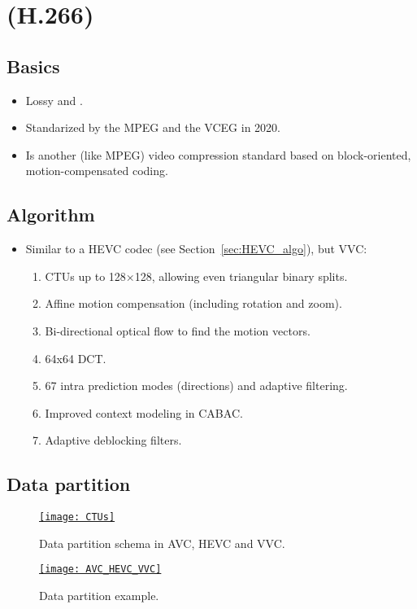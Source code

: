 \chapter{ (H.266)}

\section{Basics}
\begin{itemize}
\item Lossy and  \cite{wikipedia_VVC}.
\item Standarized by the \gls{MPEG} and the \gls{VCEG} in 2020.
\item Is another (like \gls{MPEG}) video compression standard based on
  block-oriented, motion-compensated coding.
\end{itemize}

\section{Algorithm}
\begin{itemize}
\item Similar to a \gls{HEVC} codec (see Section~\ref{sec:HEVC_algo}),
  but \gls{VVC}:
\begin{enumerate}
\item \glspl{CTU} up to 128×128, allowing even triangular binary splits.
\item Affine motion compensation (including rotation and zoom).
\item Bi-directional optical flow to find the motion vectors.
\item 64x64 \gls{DCT}.
\item 67 intra prediction modes (directions) and adaptive filtering.
\item Improved context modeling in \gls{CABAC}.
\item Adaptive deblocking filters.
\end{enumerate}
\end{itemize}

\section{Data partition}

\begin{figure}[H]
  \centering
  \href{https://thebroadcastknowledge.com/2020/11/25/video-the-new-video-codec-landscape-vvc-evc-hevc-lc-evc-av1-and-more/}{\texttt{[image: CTUs]}}
  \caption{Data partition schema in \gls{AVC}, \gls{HEVC} and \gls{VVC}.}
  \label{fig:VVC_partition_1}
\end{figure}

\begin{figure}[H]
  \centering
  \href{https://www.linkedin.com/pulse/video-coding-standards-comparison-sraas}{\texttt{[image: AVC\_HEVC\_VVC]}}
  \caption{Data partition example.}
  \label{fig:VVC_partition_1}
\end{figure}

